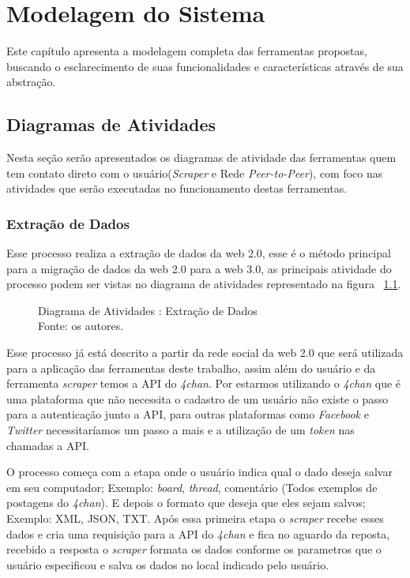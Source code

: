 \chapter{Modelagem do Sistema}

Este capítulo apresenta a modelagem completa das ferramentas
propostas, buscando o esclarecimento de suas funcionalidades e características
através de sua abstração.

\section{Diagramas de Atividades}

Nesta seção serão apresentados os diagramas de atividade das ferramentas quem tem contato direto com o usuário(\textit{Scraper} e Rede \textit{Peer-to-Peer}), com foco nas atividades que serão executadas no funcionamento destas ferramentas.
\subsection{Extração de Dados\label{subsec:extracao_de_dados}}
Esse processo realiza a extração de dados da web 2.0, esse é o método principal para a migração de dados da web 2.0 para a web 3.0, as principais atividade do processo podem ser vistas no diagrama de atividades representado na figura ~\ref{fig:extracao_de_dados}.
\begin{figure}[H]
    \centering
    
    \caption[Diagrama de Atividades : Extração de Dados]{\label{fig:extracao_de_dados}
        Diagrama de Atividades : Extração de Dados\\
        Fonte: os autores.
    }
\end{figure}
Esse processo já está descrito a partir da rede social da web 2.0 que será utilizada para a aplicação das ferramentas deste trabalho, assim além
do usuário e da ferramenta \textit{scraper} temos a API do \textit{4chan}. Por estarmos utilizando o \textit{4chan} que é uma plataforma que não necessita o cadastro de um usuário não existe o passo para a autenticação junto a API, para outras plataformas como \textit{Facebook} e \textit{Twitter} necessitaríamos um passo a mais e a utilização  de um \textit{token} nas chamadas a API.

O processo começa com a etapa onde o usuário indica qual o dado deseja salvar em seu computador; Exemplo: \textit{board}, \textit{thread}, comentário (Todos exemplos de postagens do \textit{4chan}). E depois o
formato que deseja que eles sejam salvos; Exemplo: XML, JSON, TXT. Após essa primeira etapa o \textit{scraper} recebe esses dados e cria uma requisição para a API do \textit{4chan} e fica no aguardo da
reposta, recebido a resposta o \textit{scraper} formata os dados conforme os parametros que o usuário especificou e salva os dados no local indicado pelo usuário.

